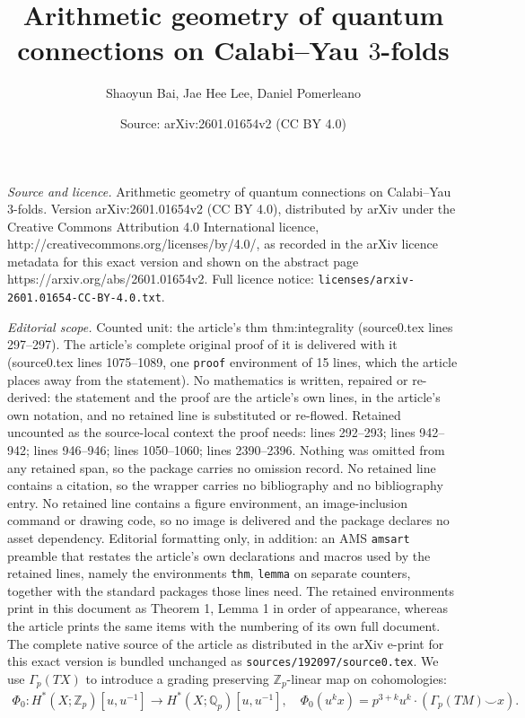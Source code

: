 \documentclass[10pt,a4paper]{amsart}
\title{Arithmetic geometry of quantum connections on Calabi--Yau $3$-folds}
\author{Shaoyun Bai, Jae Hee Lee, Daniel Pomerleano}
\date{Source: arXiv:2601.01654v2 (CC BY 4.0)}
\begin{document}
\maketitle

\noindent\emph{Source and licence.} Arithmetic geometry of quantum connections on Calabi--Yau $3$-folds. Version arXiv:2601.01654v2 (CC BY 4.0), distributed by arXiv under the Creative Commons Attribution 4.0 International licence, http://creativecommons.org/licenses/by/4.0/, as recorded in the arXiv licence metadata for this exact version and shown on the abstract page https://arxiv.org/abs/2601.01654v2. Full licence notice: \texttt{licenses/arxiv-2601.01654-CC-BY-4.0.txt}.\par\smallskip

\noindent\textit{Editorial scope.} Counted unit: the article's thm thm:integrality (source0.tex lines 297--297). The article's complete original proof of it is delivered with it (source0.tex lines 1075--1089, one \texttt{proof} environment of 15 lines, which the article places away from the statement). No mathematics is written, repaired or re-derived: the statement and the proof are the article's own lines, in the article's own notation, and no retained line is substituted or re-flowed.  Retained uncounted as the source-local context the proof needs: lines 292--293; lines 942--942; lines 946--946; lines 1050--1060; lines 2390--2396.  Nothing was omitted from any retained span, so the package carries no omission record.  No retained line contains a citation, so the wrapper carries no bibliography and no bibliography entry.  No retained line contains a figure environment, an image-inclusion command or drawing code, so no image is delivered and the package declares no asset dependency.  Editorial formatting only, in addition: an AMS \texttt{amsart} preamble that restates the article's own declarations and macros used by the retained lines, namely the environments \texttt{thm}, \texttt{lemma} on separate counters, together with the standard packages those lines need.  The retained environments print in this document as Theorem 1, Lemma 1 in order of appearance, whereas the article prints the same items with the numbering of its own full document.  The complete native source of the article as distributed in the arXiv e-print for this exact version is bundled unchanged as \texttt{sources/192097/source0.tex}.
We use $\Gamma_p(TX)$ to introduce a grading preserving $\mathbb{Z}_p$-linear map on cohomologies: \begin{align} \label{eq:b-frobenius} 
\Phi_0: H^*(X;\mathbb{Z}_p)[u,u^{-1}] \to H^*(X;\mathbb{Q}_p)[u,u^{-1}], \quad \Phi_0(u^kx) = p^{3+k} u^k\cdot(\Gamma_p(TM) \smile x). \end{align} 
\end{document}
